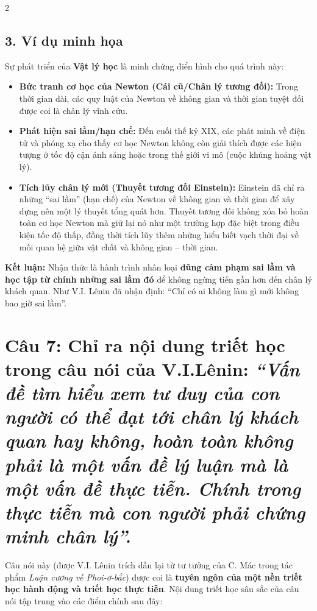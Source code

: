 \documentclass[9pt,a4paper]{extarticle}
\begin{document}
\begin{multicols*}{2}
\subsection*{3. Ví dụ minh họa}

Sự phát triển của \textbf{Vật lý học} là minh chứng điển hình cho quá trình này:

\begin{itemize}
\item \textbf{Bức tranh cơ học của Newton (Cái cũ/Chân lý tương đối):} Trong thời gian dài, các quy luật của Newton về không gian và thời gian tuyệt đối được coi là chân lý vĩnh cửu.
\item \textbf{Phát hiện sai lầm/hạn chế:} Đến cuối thế kỷ XIX, các phát minh về điện tử và phóng xạ cho thấy cơ học Newton không còn giải thích được các hiện tượng ở tốc độ cận ánh sáng hoặc trong thế giới vi mô (cuộc khủng hoảng vật lý).
\item \textbf{Tích lũy chân lý mới (Thuyết tương đối Einstein):} Einstein đã chỉ ra những ``sai lầm'' (hạn chế) của Newton về không gian và thời gian để xây dựng nên một lý thuyết tổng quát hơn. Thuyết tương đối không xóa bỏ hoàn toàn cơ học Newton mà giữ lại nó như một trường hợp đặc biệt trong điều kiện tốc độ thấp, đồng thời tích lũy thêm những hiểu biết vạch thời đại về mối quan hệ giữa vật chất và không gian -- thời gian.
\end{itemize}

\textbf{Kết luận:} Nhận thức là hành trình nhân loại \textbf{dũng cảm phạm sai lầm và học tập từ chính những sai lầm đó} để không ngừng tiến gần hơn đến chân lý khách quan. Như V.I. Lênin đã nhận định: ``Chỉ có ai không làm gì mới không bao giờ sai lầm''.

\section*{Câu 7: Chỉ ra nội dung triết học trong câu nói của V.I.Lênin: \textit{``Vấn đề tìm hiểu xem tư duy của con người có thể đạt tới chân lý khách quan hay không, hoàn toàn không phải là một vấn đề lý luận mà là một vấn đề thực tiễn. Chính trong thực tiễn mà con người phải chứng minh chân lý''.}}

Câu nói này (được V.I. Lênin trích dẫn lại từ tư tưởng của C. Mác trong tác phẩm \textit{Luận cương về Phoi-ơ-bắc}) được coi là \textbf{tuyên ngôn của một nền triết học hành động và triết học thực tiễn}. Nội dung triết học sâu sắc của câu nói tập trung vào các điểm chính sau đây:


\end{multicols*}
\end{document}
